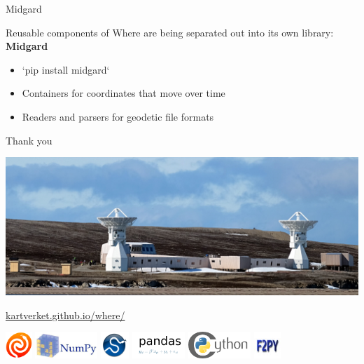 \documentclass[12pt,table,t]{beamer}
\begin{document}
\begin{frame}[c]{Midgard}

  Reusable components of Where are being separated out into its own library: \textbf{Midgard}

  \begin{itemize}
  \item `pip install midgard`
  \item Containers for coordinates that move over time
  \item Readers and parsers for geodetic file formats
  \end{itemize}
\end{frame}


\begin{frame}[c]{Thank you}
  \begin{center}
    \includegraphics[width=\textwidth]{figure/ny_alesund}

    \vfill
    {\large\url{kartverket.github.io/where/}}
    \vfill

    \includegraphics[height=1cm]{figure/logo_astropy} \hfil
    \includegraphics[height=1cm]{figure/logo_numpy} \hfil
    \includegraphics[height=1cm]{figure/logo_scipy} \hfil
    \includegraphics[height=1cm]{figure/logo_pandas} \hfil
    \includegraphics[height=1cm]{figure/logo_cython} \hfil
    \includegraphics[height=1cm]{figure/logo_f2py}
  \end{center}
\end{frame}
\end{document}
